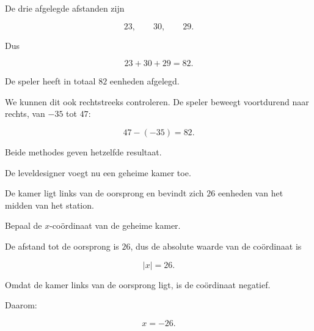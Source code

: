 \documentclass{ximera}
\begin{document}
\begin{oefening}[De metrotunnel]{\oefG\ESS}
\begin{question}
        \begin{oplossing}
        
        De drie afgelegde afstanden zijn
        
        \[
        23,\qquad 30,\qquad 29.
        \]
        
        Dus
        
        \[
        23+30+29=82.
        \]
        
        De speler heeft in totaal \(82\) eenheden afgelegd.
        
        We kunnen dit ook rechtstreeks controleren. De speler beweegt voortdurend
        naar rechts, van \(-35\) tot \(47\):
        
        \[
        47-(-35)=82.
        \]
        
        Beide methodes geven hetzelfde resultaat.
        
        \end{oplossing}
        
        \end{question}
        
        
        \begin{question}
        
        De leveldesigner voegt nu een geheime kamer toe.
        
        De kamer ligt links van de oorsprong en bevindt zich \(26\) eenheden van
        het midden van het station.
        
        Bepaal de \(x\)-coördinaat van de geheime kamer.
        
        \begin{oplossing}
        
        De afstand tot de oorsprong is \(26\), dus de absolute waarde van de
        coördinaat is
        
        \[
        |x|=26.
        \]
        
        Omdat de kamer links van de oorsprong ligt, is de coördinaat negatief.
        
        Daarom:
        
        \[
        x=-26.
        \]
        
        \end{oplossing}
        
        \end{question}
        
        
        \begin{question}
        

\end{question}
\end{oefening}
\end{document}
